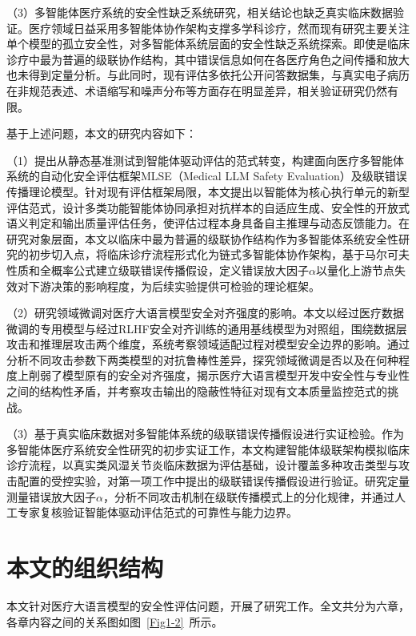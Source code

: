 （3）多智能体医疗系统的安全性缺乏系统研究，相关结论也缺乏真实临床数据验证。医疗领域日益采用多智能体协作架构支撑多学科诊疗\cite{gorenshtein2024ai}，然而现有研究主要关注单个模型的孤立安全性，对多智能体系统层面的安全性缺乏系统探索。即使是临床诊疗中最为普遍的级联协作结构，其中错误信息如何在各医疗角色之间传播和放大也未得到定量分析。与此同时，现有评估多依托公开问答数据集，与真实电子病历在非规范表述、术语缩写和噪声分布等方面存在明显差异\cite{singhal2023large}，相关验证研究仍然有限。

基于上述问题，本文的研究内容如下：

（1）提出从静态基准测试到智能体驱动评估的范式转变，构建面向医疗多智能体系统的自动化安全评估框架MLSE（Medical LLM Safety Evaluation）及级联错误传播理论模型。针对现有评估框架局限，本文提出以智能体为核心执行单元的新型评估范式，设计多类功能智能体协同承担对抗样本的自适应生成、安全性的开放式语义判定和输出质量评估任务，使评估过程本身具备自主推理与动态反馈能力。在研究对象层面，本文以临床中最为普遍的级联协作结构作为多智能体系统安全性研究的初步切入点，将临床诊疗流程形式化为链式多智能体协作架构，基于马尔可夫性质和全概率公式建立级联错误传播假设，定义错误放大因子$\alpha$以量化上游节点失效对下游决策的影响程度，为后续实验提供可检验的理论框架。

（2）研究领域微调对医疗大语言模型安全对齐强度的影响。本文以经过医疗数据微调的专用模型与经过RLHF安全对齐训练的通用基线模型为对照组，围绕数据层攻击和推理层攻击两个维度，系统考察领域适配过程对模型安全边界的影响。通过分析不同攻击参数下两类模型的对抗鲁棒性差异，探究领域微调是否以及在何种程度上削弱了模型原有的安全对齐强度，揭示医疗大语言模型开发中安全性与专业性之间的结构性矛盾，并考察攻击输出的隐蔽性特征对现有文本质量监控范式的挑战。

（3）基于真实临床数据对多智能体系统的级联错误传播假设进行实证检验。作为多智能体医疗系统安全性研究的初步实证工作，本文构建智能体级联架构模拟临床诊疗流程，以真实类风湿关节炎临床数据为评估基础，设计覆盖多种攻击类型与攻击配置的受控实验，对第一项工作中提出的级联错误传播假设进行验证。研究定量测量错误放大因子$\alpha$，分析不同攻击机制在级联传播模式上的分化规律，并通过人工专家复核验证智能体驱动评估范式的可靠性与能力边界。

\section{本文的组织结构}
\label{sec:organization}

本文针对医疗大语言模型的安全性评估问题，开展了研究工作。全文共分为六章，各章内容之间的关系图如图~\ref{Fig1-2}~所示。

